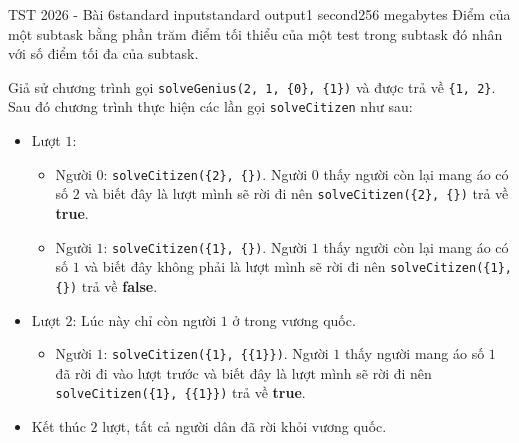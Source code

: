 \begin{problem}{TST 2026 - Bài 6}{standard input}{standard output}{1 second}{256 megabytes}
Điểm của một subtask bằng phần trăm điểm tối thiểu của một test trong subtask đó nhân với số điểm tối đa của subtask.


\Note
Giả sử chương trình gọi \texttt{solveGenius(2, 1, \{0\}, \{1\})} và được trả về \texttt{\{1, 2\}}. Sau đó chương trình thực hiện các lần gọi \texttt{solveCitizen} như sau:

\begin{itemize}
\item Lượt $1$: 
    \begin{itemize}
    \item Người $0$: \texttt{solveCitizen(\{2\}, \{\})}. Người $0$ thấy người còn lại mang áo có số $2$ và biết đây là lượt mình sẽ rời đi nên \texttt{solveCitizen(\{2\}, \{\})} trả về \textbf{true}. 
    \item Người $1$: \texttt{solveCitizen(\{1\}, \{\})}. Người $1$ thấy người còn lại mang áo có số $1$ và biết đây không phải là lượt mình sẽ rời đi nên \texttt{solveCitizen(\{1\}, \{\})} trả về \textbf{false}. 
    \end{itemize}
\item Lượt $2$: Lúc này chỉ còn người $1$ ở trong vương quốc.
    \begin{itemize}
    \item Người $1$: \texttt{solveCitizen(\{1\}, \{\{1\}\})}. Người $1$ thấy người mang áo số $1$ đã rời đi vào lượt trước và biết đây là lượt mình sẽ rời đi nên \texttt{solveCitizen(\{1\}, \{\{1\}\})} trả về \textbf{true}. 
    \end{itemize}
\item Kết thúc $2$ lượt, tất cả người dân đã rời khỏi vương quốc.
\end{itemize}

\end{problem}

